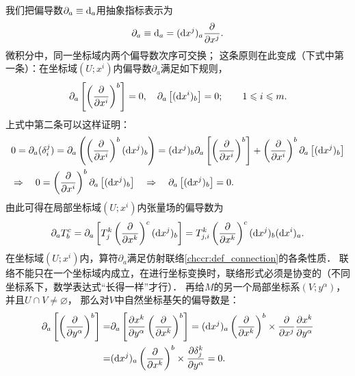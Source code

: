 我们把偏导数$\partial_a\equiv {\rm d }_a$用抽象指标表示为
\begin{equation}\label{chccr:eqn_partial-d}
    \partial_a \equiv {\rm d }_a = ({\rm d }x^j)_a \frac{\partial}{\partial x^j} .
\end{equation}
微积分中，同一坐标域内两个偏导数次序可交换；
这条原则在此变成（下式中第一条）：在坐标域$(U;x^i)$内偏导数$\partial_a$满足如下规则，
\begin{equation}\label{chccr:eqn_dpdd=0}
    \partial_a \left[ \left(\frac{\partial }{\partial x^i}\right) ^b \right] =0, \quad
    \partial_a \left[ ({\rm d }x^i)_b \right] = 0; \qquad 1 \leqslant i \leqslant m .
\end{equation}
上式中第二条可以这样证明：
\begin{align*}
  &0=\partial_a(\delta^j_i)=\partial_a\left( \left(\frac{\partial }{\partial x^i}\right) ^b
 ({\rm d }x^j)_b \right)=({\rm d }x^j)_b\partial_a \left[ \left(\frac{\partial }{\partial x^i}\right) ^b \right]
 + \left(\frac{\partial }{\partial x^i}\right) ^b\partial_a \left[ ({\rm d }x^j)_b \right] \\
 &\Rightarrow \quad 0=\left(\frac{\partial }{\partial x^i}\right) ^b \partial_a \left[ ({\rm d }x^j)_b \right]
 \quad \Rightarrow\quad  \partial_a \left[ ({\rm d }x^j)_b \right] = 0 .
\end{align*}
由此可得在局部坐标域$(U;x^i)$内张量场的偏导数为
\begin{equation}
    \partial_a T^c_b = \partial_a \left[T^k_j \left(\frac{\partial }{\partial x^k}\right) ^c
      ({\rm d }x^j)_b \right] = T^k_{j,i} \left(\frac{\partial }{\partial x^k}\right) ^c
      ({\rm d }x^j)_b  ({\rm d }x^i)_a.
\end{equation}
在坐标域$(U;x^i)$内，算符$\partial_a$满足仿射联络\ref{chccr:def_connection}的各条性质．
联络不能只在一个坐标域内成立，在进行坐标变换时，联络形式必须是协变的（不同
坐标系下，数学表达式“长得一样”才行）．
再给$M$的另一个局部坐标系$(V;y^\alpha)$，并且$U\cap V \neq \varnothing$，
那么对$V$中自然坐标基矢的偏导数是：
\begin{equation}
\begin{aligned}
    \partial_a \left[ \left(\frac{\partial }{\partial y^\alpha}\right) ^b \right]
    =& \partial_a \left[\frac{\partial x^k}{\partial y^\alpha}
      \left(\frac{\partial }{\partial x^k}\right) ^b \right]
    = ({\rm d }x^j)_a \left(\frac{\partial }{\partial x^k}\right) ^b \times
      \frac{\partial}{\partial x^j}\frac{\partial x^k}{\partial y^\alpha} \\
    =& ({\rm d }x^j)_a \left(\frac{\partial }{\partial x^k}\right) ^b\times
     \frac{\partial \delta^k_j}{\partial y^\alpha}  =0 .
\end{aligned}
\end{equation}
